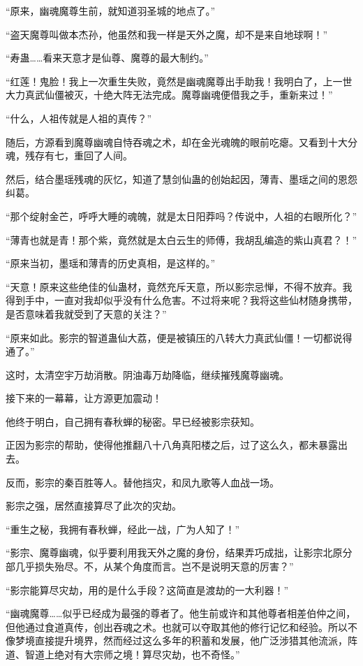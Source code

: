 \begin{this_body}
“原来，幽魂魔尊生前，就知道羽圣城的地点了。”

“盗天魔尊叫做本杰孙，他虽然和我一样是天外之魔，却不是来自地球啊！”

“寿蛊……看来天意才是仙尊、魔尊的最大制约。”

“红莲！鬼脸！我上一次重生失败，竟然是幽魂魔尊出手助我！我明白了，上一世大力真武仙僵被灭，十绝大阵无法完成。魔尊幽魂便借我之手，重新来过！”

“什么，人祖传就是人祖的真传？”

随后，方源看到魔尊幽魂自恃吞魂之术，却在金光魂魄的眼前吃瘪。又看到十大分魂，残存有七，重回了人间。

然后，结合墨瑶残魂的灰忆，知道了慧剑仙蛊的创始起因，薄青、墨瑶之间的恩怨纠葛。

“那个绽射金芒，呼呼大睡的魂魄，就是太日阳莽吗？传说中，人祖的右眼所化？”

“薄青也就是青！那个紫，竟然就是太白云生的师傅，我胡乱编造的紫山真君？！”

“原来当初，墨瑶和薄青的历史真相，是这样的。”

“天意！原来这些绝佳的仙蛊材，竟然充斥天意，所以影宗忌惮，不得不放弃。我得到手中，一直对我却似乎没有什么危害。不过将来呢？我将这些仙材随身携带，是否意味着我就受到了天意的关注？”

“原来如此。影宗的智道蛊仙大荔，便是被镇压的八转大力真武仙僵！一切都说得通了。”

这时，太清空宇万劫消散。阴油毒万劫降临，继续摧残魔尊幽魂。

接下来的一幕幕，让方源更加震动！

他终于明白，自己拥有春秋蝉的秘密。早已经被影宗获知。

正因为影宗的帮助，使得他推翻八十八角真阳楼之后，过了这么久，都未暴露出去。

反而，影宗的秦百胜等人。替他挡灾，和凤九歌等人血战一场。

影宗之强，居然直接算尽了此次的灾劫。

“重生之秘，我拥有春秋蝉，经此一战，广为人知了！”

“影宗、魔尊幽魂，似乎要利用我天外之魔的身份，结果弄巧成拙，让影宗北原分部几乎损失殆尽。不，从某个角度而言。岂不是说明天意的厉害？”

“影宗能算尽灾劫，用的是什么手段？这简直是渡劫的一大利器！”

“幽魂魔尊……似乎已经成为最强的尊者了。他生前或许和其他尊者相差伯仲之间，但他通过食道真传，创出吞魂之术。也就可以夺取其他的修行记忆和经验。所以不像梦境直接提升境界，然而经过这么多年的积蓄和发展，他广泛涉猎其他流派，阵道、智道上绝对有大宗师之境！算尽灾劫，也不奇怪。”


\end{this_body}
